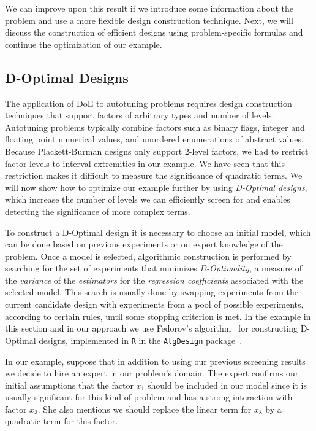 \documentclass[conference]{IEEEtran}
\begin{document}
We  can improve  upon this  result if  we introduce  some information  about the
problem and  use a more  flexible design  construction technique. Next,  we will
discuss the  construction of  efficient designs using  problem-specific formulas
and continue the optimization of our example.
\subsection{D-Optimal Designs}
\label{sec:org8eb891f}
The  application of  DoE  to autotuning  problems  requires design  construction
techniques  that  support factors  of  arbitrary  types  and number  of  levels.
Autotuning problems typically combine factors  such as binary flags, integer and
floating point numerical values, and  unordered enumerations of abstract values.
Because Plackett-Burman designs only support 2-level factors, we had to restrict
factor levels  to interval extremities  in our example.  We have seen  that this
restriction makes it  difficult to measure the significance  of quadratic terms.
We will now show how to optimize our example further by using \emph{D-Optimal designs},
which increase  the number of levels  we can efficiently screen  for and enables
detecting the significance of more complex terms.

To construct  a D-Optimal  design it  is necessary to  choose an  initial model,
which can be  done based on previous  experiments or on expert  knowledge of the
problem.  Once a  model is  selected, algorithmic  construction is  performed by
searching for the  set of experiments that minimizes \emph{D-Optimality},  a measure of
the \emph{variance} of  the \emph{estimators} for the \emph{regression  coefficients} associated with
the selected model. This search is usually done by swapping experiments from the
current candidate design  with experiments from a pool  of possible experiments,
according  to certain  rules,  until some  stopping criterion  is  met.  In  the
example   in   this   section   and   in   our   approach   we   use   Fedorov's
algorithm~\cite{fedorov1972theory}    for   constructing    D-Optimal   designs,
implemented in \texttt{R} in the \texttt{AlgDesign} package~\cite{wheeler2014algdesign}.

In our example, suppose that in addition to using our previous screening results
we decide  to hire an  expert in our problem's  domain. The expert  confirms our
initial assumptions that  the factor \(x_1\) should be included  in our model since
it is usually significant for this kind  of problem and has a strong interaction
with factor \(x_3\). She  also mentions we should replace the  linear term for \(x_8\)
by a quadratic term for this factor.
\end{document}
